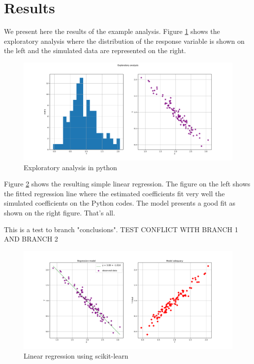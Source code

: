 \section{Results}


We present here the results of the example analysis. Figure \ref{fig:exploratory_analysis} shows the exploratory analysis where the distribution of the response variable is shown on the left and the simulated data are represented on the right.

\begin{figure}
\centering
\includegraphics[width=\textwidth]{figures/fig_exploratory_analysis.pdf}
\caption{Exploratory analysis in python}
\label{fig:exploratory_analysis}
\end{figure}

Figure \ref{fig:linear_regression} shows the resulting simple linear regression. The figure on the left shows the fitted regression line where the estimated coefficients fit very well the simulated coefficients on the Python codes. The model presents a good fit as shown on the right figure. That's all.

This is a test to branch "conclusions". TEST CONFLICT WITH BRANCH 1 AND BRANCH 2

\begin{figure}
\centering
\includegraphics[width=\textwidth]{figures/fig_linear_regression.pdf}
\caption{Linear regression using scikit-learn}
\label{fig:linear_regression}
\end{figure}